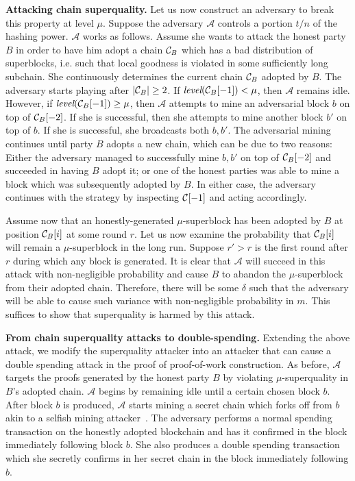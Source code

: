 \textbf{Attacking chain superquality.}
\label{subsec.superquality-attack}
Let us now construct an adversary to break this property at level $\mu$. Suppose
the adversary $\mathcal{A}$ controls a portion $t/n$ of the hashing power.
$\mathcal{A}$ works as follows. Assume she wants to attack the honest party $B$
in order to have him adopt a chain $\mathcal{C}_B$ which has a bad distribution of
superblocks, i.e. such that local goodness is violated in some sufficiently long
subchain. She continuously determines the current chain $\mathcal{C}_B$ adopted by
$B$. The adversary starts playing after $|\mathcal{C}_B| \geq 2$. If
$\textit{level}(\mathcal{C}_B[-1]) < \mu$, then $\mathcal{A}$ remains idle. However,
if $\textit{level}(\mathcal{C}_B[-1]) \geq \mu$, then $\mathcal{A}$ attempts to mine
an adversarial block $b$ on top of $\mathcal{C}_B[-2]$. If she is successful, then
she attempts to mine another block $b'$ on top of $b$. If she is successful, she
broadcasts both $b, b'$. The adversarial mining continues until party $B$ adopts
a new chain, which can be due to two reasons: Either the adversary managed to
successfully mine $b, b'$ on top of $\mathcal{C}_B[-2]$ and succeeded in having $B$
adopt it; or one of the honest parties was able to mine a block which was
subsequently adopted by $B$. In either case, the adversary continues with the
strategy by inspecting $\mathcal{C}[-1]$ and acting accordingly.

Assume now that an honestly-generated $\mu$-superblock has been adopted by $B$
at position $\mathcal{C}_B[i]$ at some round $r$. Let us now examine the probability
that $\mathcal{C}_B[i]$ will remain a $\mu$-superblock in the long run. Suppose $r' >
r$ is the first round after $r$ during which any block is generated. It is clear
that $\mathcal{A}$ will succeed in this attack with non-negligible probability
and cause $B$ to abandon the $\mu$-superblock from their adopted chain.
Therefore, there will be some $\delta$ such that the adversary will be able to
cause such variance with non-negligible probability in $m$. This suffices to
show that superquality is harmed by this attack.

\textbf{From chain superquality attacks to double-spending. }
Extending the above attack, we modify the superquality attacker into an
attacker that can cause a double spending attack in the proof of
proof-of-work construction. As before, $\mathcal{A}$ targets the proofs
generated by the honest party $B$ by violating $\mu$-superquality in $B$'s
adopted chain. $\mathcal{A}$ begins by remaining idle until a certain chosen
block $b$. After block $b$ is produced, $\mathcal{A}$ starts mining a secret
chain which forks off from $b$ akin to a selfish mining attacker~\cite{selfish}.
The adversary performs a normal spending transaction on the honestly adopted
blockchain and has it confirmed in the block immediately following block $b$.
She also produces a double spending transaction which she secretly confirms in
her secret chain in the block immediately following $b$.

